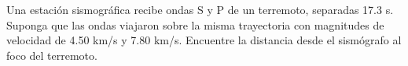 \item Una estación sismográfica recibe ondas S y P de un terremoto, separadas 17.3 s. Suponga que las ondas viajaron sobre la misma trayectoria con magnitudes de velocidad de 4.50 km/s y 7.80 km/s. Encuentre la distancia desde el sismógrafo al foco del terremoto.